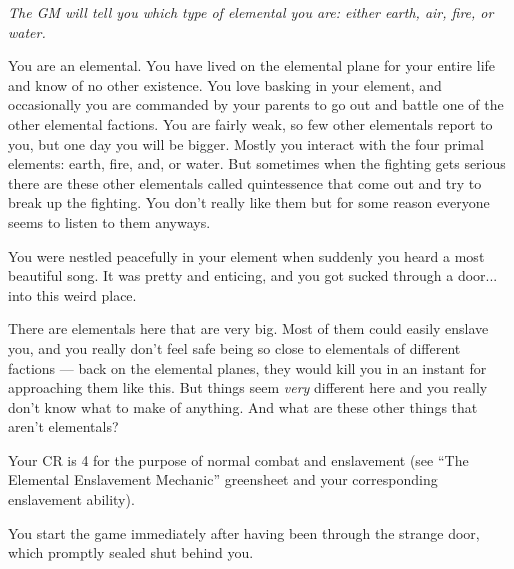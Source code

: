 \documentclass[green]{elementals}
\begin{document}
\name{\cNewElemental{}}

\emph{The GM will tell you which type of elemental you are: either earth, air, fire, or water.}

You are an elemental. You have lived on the elemental plane for your entire life and know of no other existence. You love basking in your element, and occasionally you are commanded by your parents to go out and battle one of the other elemental factions. You are fairly weak, so few other elementals report to you, but one day you will be bigger. Mostly you interact with the four primal elements: earth, fire, and, or water. But sometimes when the fighting gets serious there are these other elementals called quintessence that come out and try to break up the fighting. You don't really like them but for some reason everyone seems to listen to them anyways.

You were nestled peacefully in your element when suddenly you heard a most beautiful song.  It was pretty and enticing, and you got sucked through a door... into this weird place.

There are elementals here that are very big. Most of them could easily enslave you, and you really don't feel safe being so close to elementals of different factions --- back on the elemental planes, they would kill you in an instant for approaching them like this. But things seem \emph{very} different here and you really don't know what to make of anything. And what are these other things that aren't elementals?

Your CR is 4 for the purpose of normal combat and enslavement (see ``The Elemental Enslavement Mechanic'' greensheet and your corresponding enslavement ability).

You start the game immediately after having been through the strange door, which promptly sealed shut behind you.
\end{document}
